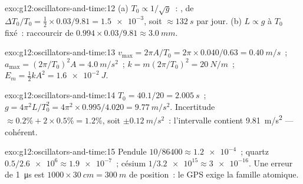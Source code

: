 \begin{solution}{exo:g12:oscillators-and-time:12}
(a) $T_0 \propto 1/\sqrt{g}$~: , de $\Delta T_0/T_0 = \tfrac12
\times 0.03/9.81 = \num{1.5e-3}$, soit $\approx \qty{132}{s}$ par
jour. (b) $L \propto g$ à $T_0$ fixé~: raccourcir de $0.994 \times
0.03/9.81 \approx \qty{3.0}{mm}$.
\end{solution}

\begin{solution}{exo:g12:oscillators-and-time:13}
$v_{\max} = 2\pi A/T_0 = 2\pi \times 0.040/0.63 = \qty{0.40}{m/s}$~;
$a_{\max} = (2\pi/T_0)^2 A = \qty{4.0}{m/s^2}$~; $k = m(2\pi/T_0)^2
= \qty{20}{N/m}$~; $E_m = \tfrac12 kA^2 = \qty{1.6e-2}{J}$.
\end{solution}

\begin{solution}{exo:g12:oscillators-and-time:14}
$T_0 = 40.1/20 = \qty{2.005}{s}$~; $g = 4\pi^2 L/T_0^2 = 4\pi^2
\times 0.995/4.020 = \qty{9.77}{m/s^2}$. Incertitude $\approx 0.2\%
+ 2 \times 0.5\% = 1.2\%$, soit $\pm\qty{0.12}{m/s^2}$~: l'intervalle
contient \qty{9.81}{m/s^2} --- cohérent.
\end{solution}

\begin{solution}{exo:g12:oscillators-and-time:15}
Pendule $10/86400 \approx \num{1.2e-4}$~; quartz $0.5/\num{2.6e6}
\approx \num{1.9e-7}$~; césium $1/\num{3.2e15} \approx \num{3e-16}$.
Une erreur de \qty{1}{\micro s} est $\num{1000} \times \qty{30}{cm}
= \qty{300}{m}$ de position~: le GPS exige la famille atomique.
\end{solution}

